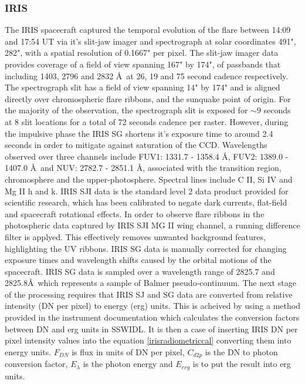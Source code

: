 \subsubsection{IRIS}
The IRIS spacecraft captured the temporal evolution of the flare between 14:09 and 17:54 UT via it's slit-jaw imager and spectrograph at solar coordinates 491", 282", with a spatial resolution of 0.1667" per pixel. The slit-jaw imager data provides coverage of a field of view spanning 167" by 174", of passbands that including 1403, 2796 and 2832 \AA\ at 26, 19 and 75 second cadence respectively. The spectrograph slit has a field of view spanning 14" by 174" and is aligned directly over chromospheric flare ribbons, and the sunquake point of origin. For the majority of the observation, the spectrograph slit is exposed for $\sim9$ seconds at 8 slit locations for a total of 72 seconds cadence per raster. However, during the impulsive phase the IRIS SG shortens it's exposure time to around 2.4 seconds in order to mitigate against saturation of the CCD. Wavelengths observed over three channels include FUV1: 1331.7 - 1358.4 \AA, FUV2: 1389.0 - 1407.0 \AA\ and NUV: 2782.7 - 2851.1 \AA, associated with the transition region, chromosphere and the upper-photosphere. Spectral lines include C II, Si IV and Mg II h and k. IRIS SJI data is the standard level 2 data product provided for scientific research, which has been calibrated to negate dark currents, flat-field and spacecraft rotational effects. In order to observe flare ribbons in the photospheric data captured by IRIS SJI MG II wing channel, a running difference filter is applyed. This effectively removes unwanted background features, highlighting the UV ribbons. IRIS SG data is manually corrected for changing exposure times and wavelength shifts caused by the orbital motions of the spacecraft. IRIS SG data is sampled over a wavelength range of 2825.7 and 2825.8\AA\ which represents a sample of Balmer pseudo-continuum. The next stage of the processing requires that IRIS SJ and SG data are converted from relative intensity (DN per pixel) to energy (erg) units. This is acheived by using a method provided in the instrument documentation \citep{2014SoPh..289.2733D} which calculates the conversion factors between DN and erg units in SSWIDL. It is then a case of inserting IRIS DN per pixel intensity values into the equation \ref{irisradiometriccal} converting them into energy units. $F_{DN}$ is flux in units of DN per pixel, $C_{d2p}$ is the DN to photon conversion factor, $E_{\lambda}$ is the photon energy and $E_{erg}$ is to put the result into erg units.  

